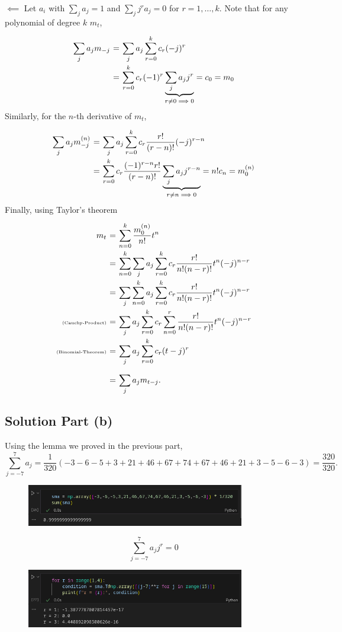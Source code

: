 $\boldsymbol{\impliedby}$ Let ${a_i}$ with $\sum_j a_j = 1$ and $\sum_j j^r a_j = 0$ for $ r = 1,\ldots, k$. Note that for any polynomial of degree $k$ $m_t$,
\[ \everymath{\displaystyle}
\arraycolsep=1.8pt\def\arraystretch{2.5}
\begin{array}{rcl}
    \sum_{j} a_j m_{-j}
    & = & \sum_{j} a_j \sum_{r = 0}^k c_r (-j)^r\\
    & = & \sum_{r = 0}^{k} c_r (-1)^r \underbrace{\sum_{j} a_j j^r }_{r \neq 0 \implies 0} = c_0 = m_0
\end{array} \]
Similarly, for the $n$-th derivative of $m_t$,
\[ \everymath{\displaystyle}
\arraycolsep=1.8pt\def\arraystretch{2.5}
\begin{array}{rcl}
    \sum_{j} a_j m^{(n)}_{-j}
    & = & \sum_{j} a_j \sum_{r = 0}^k c_r \frac{r!}{(r-n)!} (-j)^{r-n}\\
    & = & \sum_{r = 0}^{k} c_r \frac{(-1)^{r-n} r!}{(r-n)!} \underbrace{\sum_{j} a_j j^{r-n} }_{r \neq n \implies 0} = n! c_n = m^{(n)}_0
\end{array}
\]
Finally, using Taylor's theorem
\[ \everymath{\displaystyle}
\arraycolsep=1.8pt\def\arraystretch{2.5}
\begin{array}{rcl}
    m_t & = & \sum_{n = 0}^{k} \frac{m^{(n)}_0}{n!} t^n\\
    & = & \sum_{n = 0}^k \sum_{j} a_j \sum_{r = 0}^k c_r \frac{r!}{n! (n-r)!} t^n (-j)^{n-r}\\
    & = & \sum_{j} \sum_{n = 0}^k a_j \sum_{r = 0}^k c_r \frac{r!}{n! (n-r)!} t^n (-j)^{n-r}\\
    \mbox{\tiny{(Cauchy-Product)}} & = & \sum_j a_j \sum_{r = 0}^{k} c_r \sum_{n = 0}^r \frac{r!}{n! (n-r)!} t^n (-j)^{n-r}\\
    \mbox{\tiny{(Binomial-Theorem)}} & = & \sum_j a_j \sum_{r = 0}^{k} c_r (t-j)^r\\
    & = & \sum_{j} a_j m_{t-j}.
\end{array} \]

\subsection*{Solution Part (b)}
Using the lemma we proved in the previous part,
\[ \sum_{j = -7}^{7} a_j = \frac{1}{320}(-3-6-5+3+21+46+67+74+67+46+21+3-5-6-3) = \frac{320}{320}. \]

\begin{figure}[H]
    \centering
    \includegraphics[width=0.85\textwidth]{../pictures/hw1ex1.2.1.png}
\end{figure}

\[ \sum_{j = -7}^{7} a_j j^r = 0\]

\begin{figure}[H]
    \centering
    \includegraphics[width=0.85\textwidth]{../pictures/hw1ex1.2.2.png}
\end{figure}